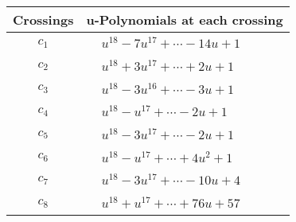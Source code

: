 \documentclass[1p]{elsarticle_modified}
\theoremstyle{definition}
\begin{document}
\begin{tabular}{m{50pt}|m{274pt}}
Crossings & \hspace{64pt}u-Polynomials at each crossing \\
\hline $$\begin{aligned}c_{1}\end{aligned}$$&$\begin{aligned}
&u^{18}-7 u^{17}+\cdots-14 u+1
\end{aligned}$\\
\hline $$\begin{aligned}c_{2}\end{aligned}$$&$\begin{aligned}
&u^{18}+3 u^{17}+\cdots+2 u+1
\end{aligned}$\\
\hline $$\begin{aligned}c_{3}\end{aligned}$$&$\begin{aligned}
&u^{18}-3 u^{16}+\cdots-3 u+1
\end{aligned}$\\
\hline $$\begin{aligned}c_{4}\end{aligned}$$&$\begin{aligned}
&u^{18}- u^{17}+\cdots-2 u+1
\end{aligned}$\\
\hline $$\begin{aligned}c_{5}\end{aligned}$$&$\begin{aligned}
&u^{18}-3 u^{17}+\cdots-2 u+1
\end{aligned}$\\
\hline $$\begin{aligned}c_{6}\end{aligned}$$&$\begin{aligned}
&u^{18}- u^{17}+\cdots+4 u^2+1
\end{aligned}$\\
\hline $$\begin{aligned}c_{7}\end{aligned}$$&$\begin{aligned}
&u^{18}-3 u^{17}+\cdots-10 u+4
\end{aligned}$\\
\hline $$\begin{aligned}c_{8}\end{aligned}$$&$\begin{aligned}
&u^{18}+u^{17}+\cdots+76 u+57
\end{aligned}$\\

\end{tabular}
\end{document}
